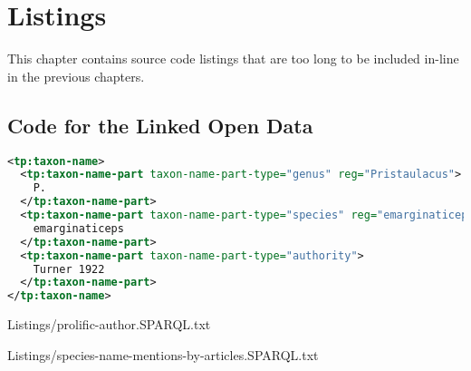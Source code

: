 \chapter{Listings} %
\label{chapter-listings}

This chapter contains source code listings that are too long to be included in-line in the previous chapters.


\section{Code for the Linked Open Data}

\begin{lstlisting}[language=XML,
caption=Taxonomic name usage of the name \emph{P. emarginaticeps} in Taxpub. Name parts are tagged with \cl{ tp:taxon-name-part} and the expansion of abbreviations (regularization) is marked up with the attribute \cl{reg},
label=listing:tnu, basicstyle=\ttfamily\scriptsize]
<tp:taxon-name>
  <tp:taxon-name-part taxon-name-part-type="genus" reg="Pristaulacus">
    P.
  </tp:taxon-name-part>
  <tp:taxon-name-part taxon-name-part-type="species" reg="emarginaticeps">
    emarginaticeps
  </tp:taxon-name-part>
  <tp:taxon-name-part taxon-name-part-type="authority">
    Turner 1922
  </tp:taxon-name-part>
</tp:taxon-name> 
\end{lstlisting}


{Listings/prolific-author.SPARQL.txt}








{Listings/species-name-mentions-by-articles.SPARQL.txt}

